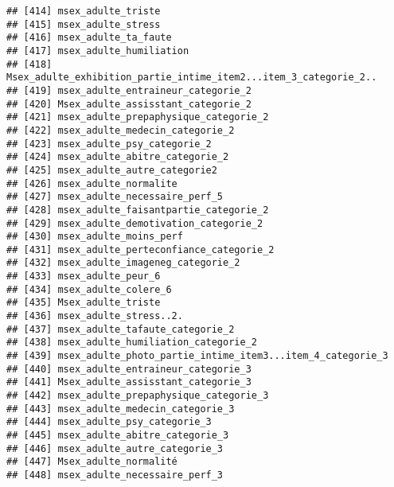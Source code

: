 \documentclass[
]{article}
\begin{document}
\begin{verbatim}
## [414] msex_adulte_triste                                               
## [415] msex_adulte_stress                                               
## [416] msex_adulte_ta_faute                                             
## [417] msex_adulte_humiliation                                          
## [418] Msex_adulte_exhibition_partie_intime_item2...item_3_categorie_2..
## [419] msex_adulte_entraineur_categorie_2                               
## [420] Msex_adulte_assisstant_categorie_2                               
## [421] msex_adulte_prepaphysique_categorie_2                            
## [422] msex_adulte_medecin_categorie_2                                  
## [423] msex_adulte_psy_categorie_2                                      
## [424] msex_adulte_abitre_categorie_2                                   
## [425] msex_adulte_autre_categorie2                                     
## [426] msex_adulte_normalite                                            
## [427] msex_adulte_necessaire_perf_5                                    
## [428] msex_adulte_faisantpartie_categorie_2                            
## [429] msex_adulte_demotivation_categorie_2                             
## [430] msex_adulte_moins_perf                                           
## [431] msex_adulte_perteconfiance_categorie_2                           
## [432] msex_adulte_imageneg_categorie_2                                 
## [433] msex_adulte_peur_6                                               
## [434] msex_adulte_colere_6                                             
## [435] Msex_adulte_triste                                               
## [436] msex_adulte_stress..2.                                           
## [437] msex_adulte_tafaute_categorie_2                                  
## [438] msex_adulte_humiliation_categorie_2                              
## [439] msex_adulte_photo_partie_intime_item3...item_4_categorie_3       
## [440] msex_adulte_entraineur_categorie_3                               
## [441] Msex_adulte_assisstant_categorie_3                               
## [442] msex_adulte_prepaphysique_categorie_3                            
## [443] msex_adulte_medecin_categorie_3                                  
## [444] msex_adulte_psy_categorie_3                                      
## [445] msex_adulte_abitre_categorie_3                                   
## [446] msex_adulte_autre_categorie_3                                    
## [447] Msex_adulte_normalité                                            
## [448] msex_adulte_necessaire_perf_3                                    

\end{verbatim}
\end{document}
